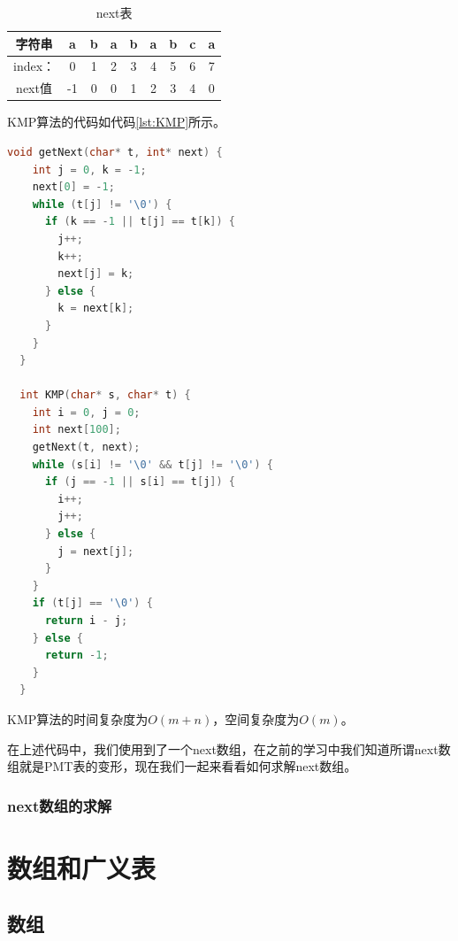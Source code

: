\documentclass[lang=cn,newtx,10pt,scheme=chinese]{elegantbook}
\begin{document}
\begin{table}[htbp]
  \centering
  \caption{next表}
  \begin{tabular}{|c|c|c|c|c|c|c|c|c|}
    \hline
    字符串 & a & b & a & b & a & b & c & a \\
    \hline
    index： & 0 & 1 & 2 & 3 & 4 & 5 & 6 & 7 \\
    \hline
    next值 & -1 & 0 & 0 & 1 & 2 & 3 & 4 & 0 \\
    \hline
  \end{tabular}
  \label{table:next}
\end{table}


KMP算法的代码如代码\ref{lst:KMP}所示。

\begin{lstlisting}[language=C++, caption={KMP算法示例代码}, label={lst:KMP}]
  void getNext(char* t, int* next) {
    int j = 0, k = -1;
    next[0] = -1;
    while (t[j] != '\0') {
      if (k == -1 || t[j] == t[k]) {
        j++;
        k++;
        next[j] = k;
      } else {
        k = next[k];
      }
    }
  }

  int KMP(char* s, char* t) {
    int i = 0, j = 0;
    int next[100];
    getNext(t, next);
    while (s[i] != '\0' && t[j] != '\0') {
      if (j == -1 || s[i] == t[j]) {
        i++;
        j++;
      } else {
        j = next[j];
      }
    }
    if (t[j] == '\0') {
      return i - j;
    } else {
      return -1;
    }
  }

\end{lstlisting}


KMP算法的时间复杂度为$O(m+n)$，空间复杂度为$O(m)$。


在上述代码中，我们使用到了一个next数组，在之前的学习中我们知道所谓next数组就是PMT表的变形，现在我们一起来看看如何求解next数组。

\subsection{next数组的求解}





\chapter{数组和广义表}

\section{数组}
\end{document}
